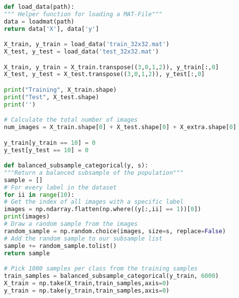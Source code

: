 \begin{lstlisting}[language=Python,label={code:SVHN},caption={Code for loading SVHN dataset}]
def load_data(path):
""" Helper function for loading a MAT-File"""
data = loadmat(path)
return data['X'], data['y']

X_train, y_train = load_data('train_32x32.mat')
X_test, y_test = load_data('test_32x32.mat')

X_train, y_train = X_train.transpose((3,0,1,2)), y_train[:,0]
X_test, y_test = X_test.transpose((3,0,1,2)), y_test[:,0]

print("Training", X_train.shape)
print("Test", X_test.shape)
print('')

# Calculate the total number of images
num_images = X_train.shape[0] + X_test.shape[0] + X_extra.shape[0]

y_train[y_train == 10] = 0
y_test[y_test == 10] = 0

def balanced_subsample_categorical(y, s):
"""Return a balanced subsample of the population"""
sample = []
# For every label in the dataset
for ii in range(10):
# Get the index of all images with a specific label
images = np.ndarray.flatten(np.where((y[:,ii] == 1))[0])
print(images)
# Draw a random sample from the images
random_sample = np.random.choice(images, size=s, replace=False)
# Add the random sample to our subsample list
sample += random_sample.tolist()
return sample

# Pick 1000 samples per class from the training samples
train_samples = balanced_subsample_categorical(y_train, 6000)
X_train = np.take(X_train,train_samples,axis=0)
y_train = np.take(y_train,train_samples,axis=0)



\end{lstlisting}


